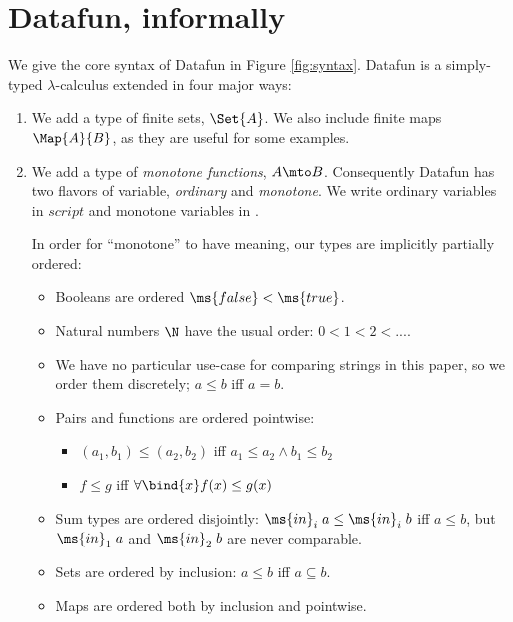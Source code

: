 \section{Datafun, informally}

We give the core syntax of Datafun in Figure \ref{fig:syntax}. Datafun is a
simply-typed $\lambda$-calculus extended in four major ways:

\begin{enumerate}
\item We add a type of finite sets, $\Set{A}$. We also include finite maps
  $\Map{A}{B}$, as they are useful for some examples.



\item We add a type of \emph{monotone functions}, $A \mto B$. Consequently
  Datafun has two flavors of variable, \emph{ordinary} and \emph{monotone}. We
  write ordinary variables in $script$ and monotone variables in .

  In order for ``monotone'' to have meaning, our types are implicitly partially
  ordered:
  \begin{itemize}
  \item Booleans are ordered $\ms{false} < \ms{true}$.
  \item Natural numbers $\N$ have the usual order: $0 < 1 < 2 < ...$.
  \item We have no particular use-case for comparing strings in this paper, so
    we order them discretely; $a \le b$ iff $a = b$. 
  \item Pairs and functions are ordered pointwise:
    \begin{itemize}
    \item $(a_1, b_1) \le (a_2, b_2)$ iff $a_1 \le a_2 \wedge b_1 \le b_2$
    \item $f \le g$ iff $\forall \bind{x} f(x) \le g(x)$
    \end{itemize}
  \item Sum types are ordered disjointly: $\ms{in}_i\; a \le \ms{in}_i\; b$ iff
    $a \le b$, but $\ms{in}_1\; a$ and $\ms{in}_2\; b$ are never comparable.
  \item Sets are ordered by inclusion: $a \le b$ iff $a \subseteq b$.
  \item Maps are ordered both by inclusion and pointwise.
  \end{itemize}


\end{enumerate}
